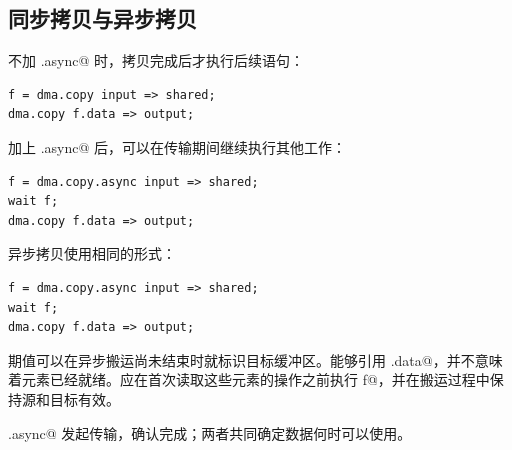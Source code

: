 \subsection*{同步拷贝与异步拷贝}

不加 \co@.async@ 时，拷贝完成后才执行后续语句：

\begin{lstlisting}[language=croqtile,caption={同步拷贝}]
f = dma.copy input => shared;
dma.copy f.data => output;
\end{lstlisting}

加上 \co@.async@ 后，可以在传输期间继续执行其他工作：

\begin{lstlisting}[language=croqtile,caption={异步拷贝}]
f = dma.copy.async input => shared;
wait f;
dma.copy f.data => output;
\end{lstlisting}

异步拷贝使用相同的形式：

\begin{lstlisting}[language=croqtile,caption={异步拷贝}]
f = dma.copy.async input => shared;
wait f;
dma.copy f.data => output;
\end{lstlisting}

期值可以在异步搬运尚未结束时就标识目标缓冲区。能够引用 \co@f.data@，并不意味着元素已经就绪。应在首次读取这些元素的操作之前执行 \co@wait f@，并在搬运过程中保持源和目标有效。

\co@.async@ 发起传输，\co@wait@ 确认完成；两者共同确定数据何时可以使用。
